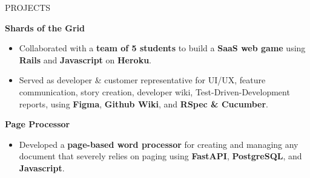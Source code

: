 \documentclass{resume} %
\begin{document}
\begin{rSection}{PROJECTS}
\vspace{-1.25em}
\item \textbf{Shards of the Grid} 
\begin{itemize}
   \itemsep -3pt {} 
   \item Collaborated with a \textbf{team of 5 students} to build a \textbf{SaaS web game} using \textbf{Rails} and \textbf{Javascript} on \textbf{Heroku}.
   \item Served as developer \& customer representative for UI/UX, feature communication, story creation, developer wiki, Test-Driven-Development reports, using \textbf{Figma}, \textbf{Github Wiki}, and \textbf{RSpec \& Cucumber}.
\end{itemize}

\item \textbf{Page Processor} 
\begin{itemize}
   \itemsep -3pt {} 
     \item Developed a \textbf{page-based word processor} for creating and managing any document that severely relies on paging
     using \textbf{FastAPI}, \textbf{PostgreSQL}, and \textbf{Javascript}.
\end{itemize}

\end{rSection} 


       
\end{document}
